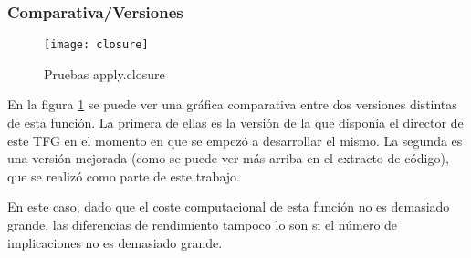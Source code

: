\subsubsection{Comparativa/Versiones} 

\begin{figure}[H]
    \centering
    \texttt{[image: closure]}
    \caption{Pruebas apply.closure}
    \label{fig:closure}
\end{figure} 

En la figura \ref{fig:closure} se puede ver una gr\'afica comparativa entre dos versiones distintas de esta funci\'on. La primera de ellas es la versi\'on de la que dispon\'ia el director de este TFG en el momento en que se empez\'o a desarrollar el mismo. La segunda es una versi\'on mejorada (como se puede ver m\'as arriba en el extracto de c\'odigo), que se realiz\'o como parte de este trabajo.

En este caso, dado que el coste computacional de esta funci\'on no es demasiado grande, las diferencias de rendimiento tampoco lo son si el n\'umero de implicaciones no es demasiado grande.


